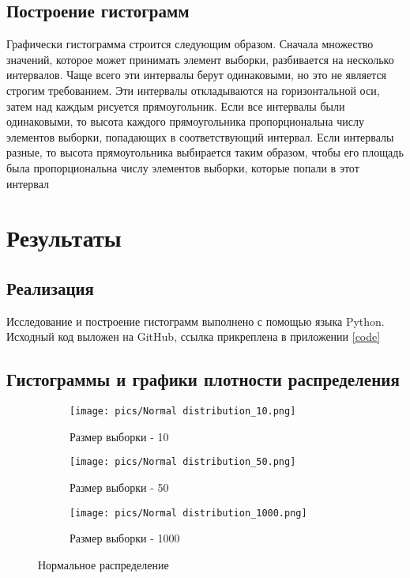 \documentclass[a4paper, 14pt]{extreport}
\begin{document}
\section{Построение гистограмм}

Графически гистограмма строится следующим образом. Сначала множество значений, которое может принимать элемент выборки, разбивается на несколько интервалов. Чаще всего эти интервалы берут одинаковыми, но это не является строгим требованием. Эти интервалы откладываются на
горизонтальной оси, затем над каждым рисуется прямоугольник. Если все интервалы были одинаковыми, то высота каждого прямоугольника пропорциональна числу элементов выборки, попадающих в соответствующий интервал. Если интервалы разные, то высота прямоугольника выбирается таким образом, чтобы его площадь была пропорциональна числу элементов выборки, которые попали в этот интервал \cite{Histogram}

\chapter{Результаты}

\section{Реализация}
\noindent
Исследование и построение гистограмм выполнено с помощью языка Python.
Исходный код выложен на GitHub, ссылка прикреплена в приложении \ref{code}

\section{Гистограммы и графики плотности распределения}

\begin{figure}
    \centering
    \begin{subfigure}[b]{0.5\textwidth}
    \texttt{[image: pics/Normal distribution\_10.png]}
    \caption{Размер выборки - 10}
    \end{subfigure}
    
    \begin{subfigure}[b]{0.5\textwidth}
    \texttt{[image: pics/Normal distribution\_50.png]}
    \caption{Размер выборки - 50}
    \end{subfigure}
    
    \begin{subfigure}[b]{0.5\textwidth}
    \texttt{[image: pics/Normal distribution\_1000.png]}
    \caption{Размер выборки - 1000}
    \end{subfigure}
    \caption{Нормальное распределение}
    \label{fig:normal}
\end{figure}
\end{document}
